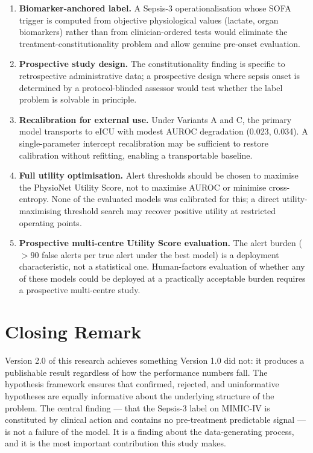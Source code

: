\begin{enumerate}
  \item \textbf{Biomarker-anchored label.} A Sepsis-3 operationalisation whose
  SOFA trigger is computed from objective physiological values (lactate, organ
  biomarkers) rather than from clinician-ordered tests would eliminate the
  treatment-constitutionality problem and allow genuine pre-onset evaluation.
  \item \textbf{Prospective study design.} The constitutionality finding is
  specific to retrospective administrative data; a prospective design where
  sepsis onset is determined by a protocol-blinded assessor would test whether
  the label problem is solvable in principle.
  \item \textbf{Recalibration for external use.} Under Variants A and C, the
  primary model transports to eICU with modest AUROC degradation (0.023, 0.034).
  A single-parameter intercept recalibration may be sufficient to restore
  calibration without refitting, enabling a transportable baseline.
  \item \textbf{Full utility optimisation.} Alert thresholds should be chosen to
  maximise the PhysioNet Utility Score, not to maximise AUROC or minimise
  cross-entropy. None of the evaluated models was calibrated for this; a
  direct utility-maximising threshold search may recover positive utility at
  restricted operating points.
  \item \textbf{Prospective multi-centre Utility Score evaluation.} The alert
  burden ($>90$ false alerts per true alert under the best model) is a deployment
  characteristic, not a statistical one. Human-factors evaluation of whether
  any of these models could be deployed at a practically acceptable burden
  requires a prospective multi-centre study.
\end{enumerate}

\section{Closing Remark}

Version 2.0 of this research achieves something Version 1.0 did not: it produces
a publishable result regardless of how the performance numbers fall. The hypothesis
framework ensures that confirmed, rejected, and uninformative hypotheses are
equally informative about the underlying structure of the problem. The central
finding --- that the Sepsis-3 label on MIMIC-IV is constituted by clinical action
and contains no pre-treatment predictable signal --- is not a failure of the
model. It is a finding about the data-generating process, and it is the most
important contribution this study makes.
